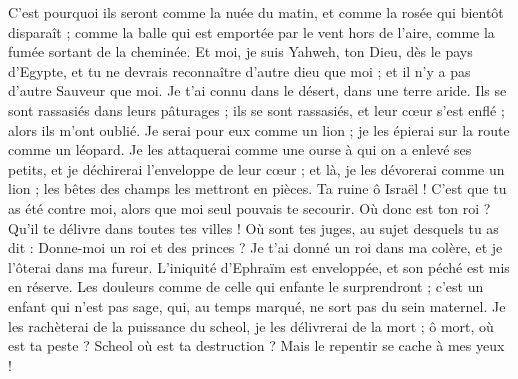 \begin{multicols}{2}
C'est pourquoi ils seront comme la nuée du matin, et comme la rosée qui bientôt disparaît ; comme la balle qui est emportée par le vent hors de l'aire, comme la fumée sortant de la cheminée.
Et moi, je suis Yahweh, ton Dieu, dès le pays d'Egypte, et tu ne devrais reconnaître d'autre dieu que moi ; et il n'y a pas d'autre Sauveur que moi.
Je t'ai connu dans le désert, dans une terre aride.
Ils se sont rassasiés dans leurs pâturages ; ils se sont rassasiés, et leur cœur s'est enflé ; alors ils m'ont oublié.
Je serai pour eux comme un lion ; je les épierai sur la route comme un léopard.
Je les attaquerai comme une ourse à qui on a enlevé ses petits, et je déchirerai l'enveloppe de leur cœur ; et là, je les dévorerai comme un lion ; les bêtes des champs les mettront en pièces.
Ta ruine ô Israël ! C'est que tu as été contre moi, alors que moi seul pouvais te secourir.
Où donc est ton roi ? Qu'il te délivre dans toutes tes villes ! Où sont tes juges, au sujet desquels tu as dit : Donne-moi un roi et des princes ?
Je t'ai donné un roi dans ma colère, et je l'ôterai dans ma fureur.
L'iniquité d'Ephraïm est enveloppée, et son péché est mis en réserve.
Les douleurs comme de celle qui enfante le surprendront ; c'est un enfant qui n'est pas sage, qui, au temps marqué, ne sort pas du sein maternel.
Je les rachèterai de la puissance du scheol, je les délivrerai de la mort ; ô mort, où est ta peste ? Scheol où est ta destruction ? Mais le repentir se cache à mes yeux !

\end{multicols}
